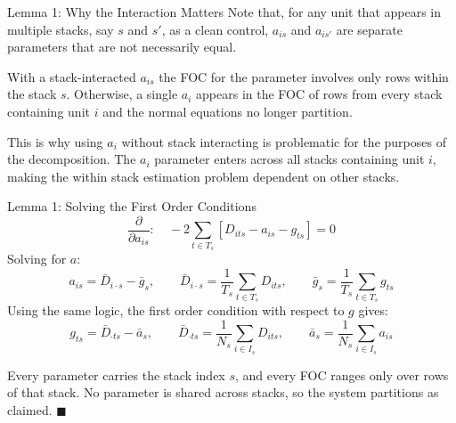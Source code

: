 \documentclass[11pt]{beamer}
\begin{document}
\begin{frame}{Lemma 1: Why the Interaction Matters}
    Note that, for any unit that appears in multiple stacks, say $s$ and $s'$,
    as a clean control, $a_{is}$ and $a_{is'}$ are separate parameters that are
    not necessarily equal.

    \vspace{3mm}

    With a stack-interacted $a_{is}$ the FOC for the parameter involves only
    rows within the stack $s$. Otherwise, a single $a_i$ appears in the FOC of
    rows from every stack containing unit $i$ and the normal equations no longer
    partition.

    \vspace{5mm}

    \footnotesize
    This is why using $a_i$ without stack interacting is problematic for the purposes of the decomposition. The $a_i$ parameter enters across all stacks containing unit $i$, making the within stack estimation problem dependent on other stacks.
\end{frame}

\begin{frame}{Lemma 1: Solving the First Order Conditions}
    \[
        \frac{\partial}{\partial a_{is}}: \quad
        -2 \sum_{t \in T_s} \left[ D_{its} - a_{is} - g_{ts} \right] = 0
    \]
    Solving for $a$:
    \[
        a_{is} = \bar{D}_{i \cdot s} - \bar{g}_s,
        \qquad
        \bar{D}_{i \cdot s} = \frac{1}{T_s} \sum_{t \in T_s} D_{its},
        \qquad
        \bar{g}_s = \frac{1}{T_s} \sum_{t \in T_s} g_{ts}
    \]
    Using the same logic, the first order condition with respect to $g$ gives:
    \[
        g_{ts} = \bar{D}_{\cdot ts} - \bar{a}_s,
        \qquad
        \bar{D}_{\cdot ts} = \frac{1}{N_s} \sum_{i \in I_s} D_{its},
        \qquad
        \bar{a}_s = \frac{1}{N_s} \sum_{i \in I_s} a_{is}
    \]

    \vspace{3mm}

    Every parameter carries the stack index $s$, and every FOC ranges only over
    rows of that stack. No parameter is shared across stacks, so the system
    partitions as claimed. \hfill $\blacksquare$
\end{frame}
\end{document}
